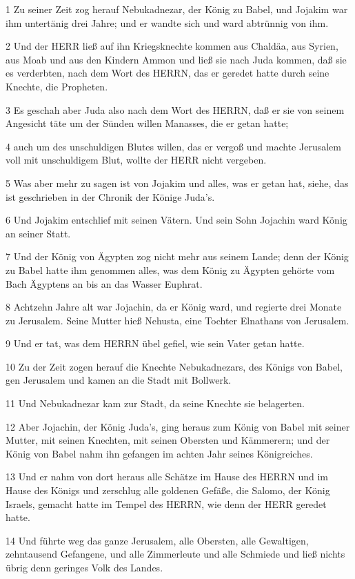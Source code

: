 \par 1 Zu seiner Zeit zog herauf Nebukadnezar, der König zu Babel, und Jojakim war ihm untertänig drei Jahre; und er wandte sich und ward abtrünnig von ihm.
\par 2 Und der HERR ließ auf ihn Kriegsknechte kommen aus Chaldäa, aus Syrien, aus Moab und aus den Kindern Ammon und ließ sie nach Juda kommen, daß sie es verderbten, nach dem Wort des HERRN, das er geredet hatte durch seine Knechte, die Propheten.
\par 3 Es geschah aber Juda also nach dem Wort des HERRN, daß er sie von seinem Angesicht täte um der Sünden willen Manasses, die er getan hatte;
\par 4 auch um des unschuldigen Blutes willen, das er vergoß und machte Jerusalem voll mit unschuldigem Blut, wollte der HERR nicht vergeben.
\par 5 Was aber mehr zu sagen ist von Jojakim und alles, was er getan hat, siehe, das ist geschrieben in der Chronik der Könige Juda's.
\par 6 Und Jojakim entschlief mit seinen Vätern. Und sein Sohn Jojachin ward König an seiner Statt.
\par 7 Und der König von Ägypten zog nicht mehr aus seinem Lande; denn der König zu Babel hatte ihm genommen alles, was dem König zu Ägypten gehörte vom Bach Ägyptens an bis an das Wasser Euphrat.
\par 8 Achtzehn Jahre alt war Jojachin, da er König ward, und regierte drei Monate zu Jerusalem. Seine Mutter hieß Nehusta, eine Tochter Elnathans von Jerusalem.
\par 9 Und er tat, was dem HERRN übel gefiel, wie sein Vater getan hatte.
\par 10 Zu der Zeit zogen herauf die Knechte Nebukadnezars, des Königs von Babel, gen Jerusalem und kamen an die Stadt mit Bollwerk.
\par 11 Und Nebukadnezar kam zur Stadt, da seine Knechte sie belagerten.
\par 12 Aber Jojachin, der König Juda's, ging heraus zum König von Babel mit seiner Mutter, mit seinen Knechten, mit seinen Obersten und Kämmerern; und der König von Babel nahm ihn gefangen im achten Jahr seines Königreiches.
\par 13 Und er nahm von dort heraus alle Schätze im Hause des HERRN und im Hause des Königs und zerschlug alle goldenen Gefäße, die Salomo, der König Israels, gemacht hatte im Tempel des HERRN, wie denn der HERR geredet hatte.
\par 14 Und führte weg das ganze Jerusalem, alle Obersten, alle Gewaltigen, zehntausend Gefangene, und alle Zimmerleute und alle Schmiede und ließ nichts übrig denn geringes Volk des Landes.
